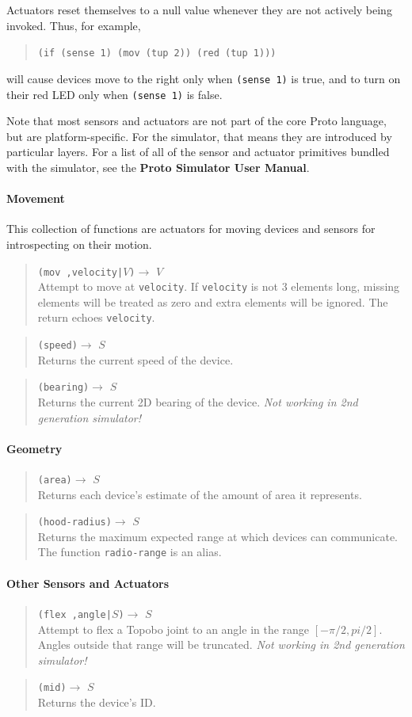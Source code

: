 \documentclass{article}
\newcommand\nosecgen{{\em Not working in 2nd generation simulator!}}
\newcommand\code[1]{\begin{quote}\var{#1}\end{quote}}
\newcommand\function[3]
{\begin{quote}{\tt #1}$\rightarrow$ \type{#2} \\ #3 \end{quote}}
\newcommand\type[1]{$#1$}
\newcommand\var[1]{{\tt #1}}
\begin{document}
Actuators reset themselves to a null value whenever they are not
actively being invoked.  Thus, for example, 
\code{(if (sense 1) (mov (tup 2)) (red (tup 1)))} 
will cause devices move to the right only when \var{(sense 1)} is
true, and to turn on their red LED only when \var{(sense 1)} is false.

Note that most sensors and actuators are not part of the core Proto
language, but are platform-specific.  For the simulator, that means
they are introduced by particular layers.  For a list of all of the
sensor and actuator primitives bundled with the simulator, see the 
{\bf Proto Simulator User Manual}.

\paragraph{Movement}

This collection of functions are actuators for moving devices
and sensors for introspecting on their motion.

\function{(mov ,velocity|\type{V})}{V}{Attempt to move at
  \var{velocity}.  If \var{velocity} is not 3 elements long, missing
  elements will be treated as zero and extra elements will be ignored.
  The return echoes \var{velocity}.}

\function{(speed)}{S}{Returns the current speed of the device.}

\function{(bearing)}{S}{Returns the current 2D bearing of the
  device. \nosecgen{}}

\paragraph{Geometry}

\function{(area)}{S}{Returns each device's estimate of the amount of
  area it represents.}
\function{(hood-radius)}{S}{Returns the maximum expected range at which
  devices can communicate.  The function \var{radio-range} is an alias.}

\paragraph{Other Sensors and Actuators}

\function{(flex ,angle|\type{S})}{S}{Attempt to flex a Topobo
  joint to an angle in the range $[-\pi/2, pi/2]$.  Angles outside
  that range will be truncated.  \nosecgen{}}

\function{(mid)}{S}{Returns the device's ID.}
\end{document}
